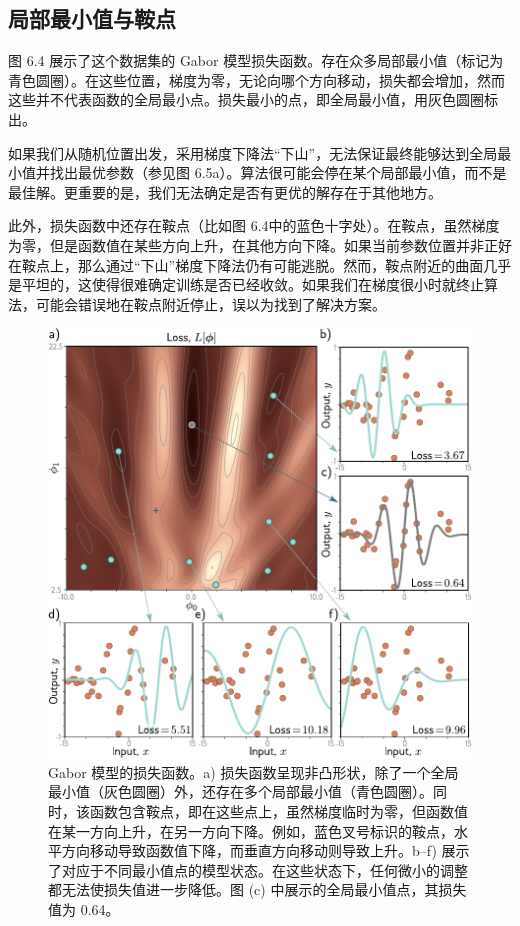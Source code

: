 \documentclass[lang=cn,newtx,10pt,scheme=chinese]{elegantbook}
\begin{document}
\subsection{局部最小值与鞍点}
图 6.4 展示了这个数据集的 Gabor 模型损失函数。存在众多局部最小值（标记为青色圆圈）。在这些位置，梯度为零，无论向哪个方向移动，损失都会增加，然而这些并不代表函数的全局最小点。损失最小的点，即全局最小值，用灰色圆圈标出。

如果我们从随机位置出发，采用梯度下降法“下山”，无法保证最终能够达到全局最小值并找出最优参数（参见图 6.5a）。算法很可能会停在某个局部最小值，而不是最佳解。更重要的是，我们无法确定是否有更优的解存在于其他地方。

此外，损失函数中还存在鞍点（比如图 6.4中的蓝色十字处）。在鞍点，虽然梯度为零，但是函数值在某些方向上升，在其他方向下降。如果当前参数位置并非正好在鞍点上，那么通过“下山”梯度下降法仍有可能逃脱。然而，鞍点附近的曲面几乎是平坦的，这使得很难确定训练是否已经收敛。如果我们在梯度很小时就终止算法，可能会错误地在鞍点附近停止，误以为找到了解决方案。


\begin{figure}[ht!]
\centering
\includegraphics[width=0.7\linewidth]{PDFFigures/UDLChap6PDF/TrainGaborMin.pdf}
\caption{Gabor 模型的损失函数。a) 损失函数呈现非凸形状，除了一个全局最小值（灰色圆圈）外，还存在多个局部最小值（青色圆圈）。同时，该函数包含鞍点，即在这些点上，虽然梯度临时为零，但函数值在某一方向上升，在另一方向下降。例如，蓝色叉号标识的鞍点，水平方向移动导致函数值下降，而垂直方向移动则导致上升。b–f) 展示了对应于不同最小值点的模型状态。在这些状态下，任何微小的调整都无法使损失值进一步降低。图 (c) 中展示的全局最小值点，其损失值为 0.64。}
\end{figure}
\end{document}
